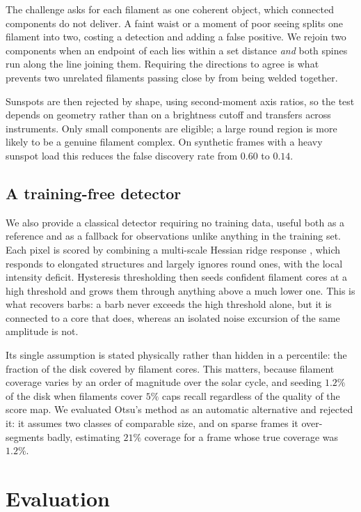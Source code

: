 \documentclass[11pt]{article}
\begin{document}
The challenge asks for each filament as one coherent object, which connected
components do not deliver. A faint waist or a moment of poor seeing splits one
filament into two, costing a detection and adding a false positive. We rejoin
two components when an endpoint of each lies within a set distance \emph{and}
both spines run along the line joining them. Requiring the directions to agree
is what prevents two unrelated filaments passing close by from being welded
together.

Sunspots are then rejected by shape, using second-moment axis ratios, so the
test depends on geometry rather than on a brightness cutoff and transfers
across instruments. Only small components are eligible; a large round region is
more likely to be a genuine filament complex. On synthetic frames with a heavy
sunspot load this reduces the false discovery rate from $0.60$ to $0.14$.

\subsection{A training-free detector}

We also provide a classical detector requiring no training data, useful both as
a reference and as a fallback for observations unlike anything in the training
set. Each pixel is scored by combining a multi-scale Hessian ridge response
\cite{frangi1998}, which responds to elongated structures and largely ignores
round ones, with the local intensity deficit. Hysteresis thresholding then
seeds confident filament cores at a high threshold and grows them through
anything above a much lower one. This is what recovers barbs: a barb never
exceeds the high threshold alone, but it is connected to a core that does,
whereas an isolated noise excursion of the same amplitude is not.

Its single assumption is stated physically rather than hidden in a percentile:
the fraction of the disk covered by filament cores. This matters, because
filament coverage varies by an order of magnitude over the solar cycle, and
seeding $1.2\%$ of the disk when filaments cover $5\%$ caps recall regardless of
the quality of the score map. We evaluated Otsu's method as an automatic
alternative and rejected it: it assumes two classes of comparable size, and on
sparse frames it over-segments badly, estimating $21\%$ coverage for a frame
whose true coverage was $1.2\%$.

\section{Evaluation}
\end{document}
